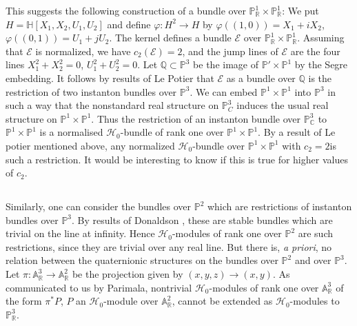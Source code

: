 This suggests the following construction of a bundle over
$\mathbb{P}^{1}_{\mathbb{R}}\times \mathbb{P}^{1}_{\mathbb{R}}$: We
put $H=\mathbb{H}[X_{1},X_{2},U_{1},U_{2}]$ and define
$\varphi:H^{2}\to H$ by $\varphi((1,0))=X_{1}+iX_{2}$,
$\varphi((0,1))=U_{1}+jU_{2}$. The kernel defines a bundle
$\mathscr{E}$ over
$\mathbb{P}^{1}_{\mathbb{R}}\times \mathbb{P}^{1}_{\mathbb{R}}$. Assuming
that $\mathscr{E}$ is normalized, we have $c_{2}(\mathscr{E})=2$, and
the jump lines of $\mathscr{E}$ are the four lines
$X^{2}_{1}+X^{2}_{2}=0$, $U^{2}_{1}+U^{2}_{2}=0$. Let
$\mathbb{Q}\subset \mathbb{P}^{3}$ be the image of
$\mathbb{P}'\times \mathbb{P}^{1}$ by the Segre embedding. It follows
by results of Le Potier \cite{chap9-key8} that $\mathscr{E}$ as a
bundle over $\mathbb{Q}$ is the restriction of two instanton bundles
over $\mathbb{P}^{3}$. We can embed
$\mathbb{P}^{1}\times \mathbb{P}^{1}$ into $\mathbb{P}^{3}$ in such a
way that the nonstandard real structure on $\mathbb{P}^{3}_{C}$
induces the usual real structure on
$\mathbb{P}^{1}\times \mathbb{P}^{1}$. Thus the restriction of an
instanton bundle over $\mathbb{P}^{3}_{\mathbb{C}}$ to
$\mathbb{P}^{1}\times \mathbb{P}^{1}$ is a normalised
$\mathscr{H}_{0}$-bundle of rank one over
$\mathbb{P}^{1}\times \mathbb{P}^{1}$. By a result of Le potier
mentioned above, any normalized $\mathscr{H}_{0}$-bundle over
$\mathbb{P}^{1}\times \mathbb{P}^{1}$ with $c_{2}=2$\pageoriginale is
such a restriction. It would be interesting to know if this is true
for higher values of $c_{2}$.

\subsection{}\label{chap9-sec10.3}

Similarly, one can consider the bundles over $\mathbb{P}^{2}$ which
are restrictions of instanton bundles over $\mathbb{P}^{3}$. By
results of Donaldson \cite{chap9-key3}, these are stable bundles
which are trivial on the line at infinity. Hence
$\mathscr{H}_{0}$-modules of rank one over $\mathbb{P}^{2}$ are such
restrictions, since they are trivial over any real line. But there is,
{\em a priori}, no relation between the quaternionic structures on the
bundles over $\mathbb{P}^{2}$ and over $\mathbb{P}^{3}$. Let
$\pi:\mathbb{A}^{3}_{\mathbb{R}}\to \mathbb{A}^{2}_{\mathbb{R}}$ be
the projection given by $(x,y,z)\to (x,y)$. As communicated to us by
Parimala, nontrivial $\mathscr{H}_{0}$-modules of rank one over
$\mathbb{A}^{3}_{\mathbb{R}}$ of the form $\pi^{*}P$, $P$ an
$\mathscr{H}_{0}$-module over $\mathbb{A}^{2}_{\mathbb{R}}$, cannot be
extended as $\mathscr{H}_{0}$-modules to
$\mathbb{P}^{3}_{\mathbb{R}}$. 

